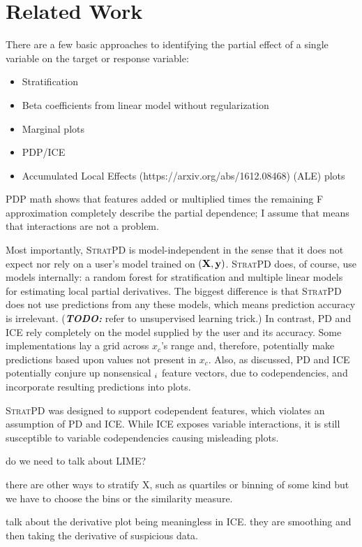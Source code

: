 \documentclass[12pt]{article}
\newcommand{\todo}[1]{{\bf\em TODO:} {{#1}}}
\newcommand{\spd}{\fontfamily{cmr}\textsc{\small StratPD}}
\begin{document}
\section{Related Work}

There are a few basic approaches to identifying the partial effect of a single variable on the target or response variable:

\begin{itemize}
\item Stratification
\item Beta coefficients from linear model without regularization
\item Marginal plots
\item PDP/ICE
\item Accumulated Local Effects (https://arxiv.org/abs/1612.08468) (ALE) plots
\end{itemize}

PDP math shows that features added or multiplied times the remaining F approximation completely describe the partial dependence; I assume that means that interactions are not a problem.

Most importantly, \spd{} is model-independent in the sense that it does not expect nor rely on a user's model trained on $({\bf X}, {\bf y})$.  \spd{} does, of course, use models internally: a random forest for stratification and multiple linear models for estimating local partial derivatives.  The biggest difference is that \spd{} does not use predictions from any these models, which means prediction accuracy is irrelevant.  (\todo{refer to unsupervised learning trick}.)  In contrast, PD and ICE rely completely on the model supplied by the user and its accuracy.  Some implementations lay a grid across $x_c$'s range and, therefore, potentially make predictions based upon values not present in $x_c$. Also, as discussed, PD and ICE potentially conjure up nonsensical ${\bf }_i$ feature vectors, due to codependencies, and incorporate resulting predictions into plots.

\spd{} was designed to support codependent features, which violates an assumption of PD and ICE. While ICE exposes variable interactions, it is still susceptible to variable codependencies causing misleading plots.

do we need to talk about LIME?

there are other ways to stratify X, such as quartiles or binning of some kind but we have to choose the bins or the similarity measure.

talk about the derivative plot being meaningless in ICE.  they are smoothing and then taking the derivative of suspicious data.
 
\end{document}

